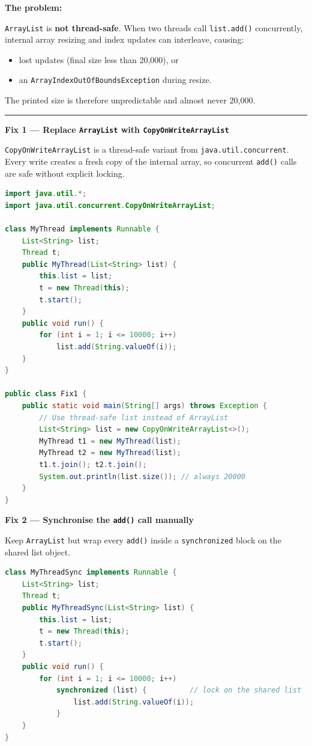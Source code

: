 \documentclass[12pt,a3paper]{article}
\begin{document}
\begin{enumerate}
\begin{tcolorbox}
\textbf{The problem:}

\texttt{ArrayList} is \textbf{not thread-safe}.  When two threads call
\texttt{list.add()} concurrently, internal array resizing and index
updates can interleave, causing:
\begin{itemize}[itemsep=1pt]
  \item lost updates (final size less than 20{,}000), or
  \item an \texttt{ArrayIndexOutOfBoundsException} during resize.
\end{itemize}
The printed size is therefore unpredictable and almost never
20{,}000.

\medskip
\textcolor{cF}{\rule{\textwidth}{0.4pt}}
\medskip

\textbf{Fix 1 --- Replace \texttt{ArrayList} with
\texttt{CopyOnWriteArrayList}}

\texttt{CopyOnWriteArrayList} is a thread-safe variant from
\texttt{java.util.concurrent}.  Every write creates a fresh copy of
the internal array, so concurrent \texttt{add()} calls are safe
without explicit locking.

\begin{lstlisting}[language=Java]
import java.util.*;
import java.util.concurrent.CopyOnWriteArrayList;

class MyThread implements Runnable {
    List<String> list;
    Thread t;
    public MyThread(List<String> list) {
        this.list = list;
        t = new Thread(this);
        t.start();
    }
    public void run() {
        for (int i = 1; i <= 10000; i++)
            list.add(String.valueOf(i));
    }
}

public class Fix1 {
    public static void main(String[] args) throws Exception {
        // Use thread-safe list instead of ArrayList
        List<String> list = new CopyOnWriteArrayList<>();
        MyThread t1 = new MyThread(list);
        MyThread t2 = new MyThread(list);
        t1.t.join(); t2.t.join();
        System.out.println(list.size()); // always 20000
    }
}
\end{lstlisting}

\medskip
\textbf{Fix 2 --- Synchronise the \texttt{add()} call manually}

Keep \texttt{ArrayList} but wrap every \texttt{add()} inside a
\texttt{synchronized} block on the shared list object.

\begin{lstlisting}[language=Java]
class MyThreadSync implements Runnable {
    List<String> list;
    Thread t;
    public MyThreadSync(List<String> list) {
        this.list = list;
        t = new Thread(this);
        t.start();
    }
    public void run() {
        for (int i = 1; i <= 10000; i++)
            synchronized (list) {          // lock on the shared list
                list.add(String.valueOf(i));
            }
    }
}


\end{lstlisting}
\end{tcolorbox}
\end{enumerate}
\end{document}
